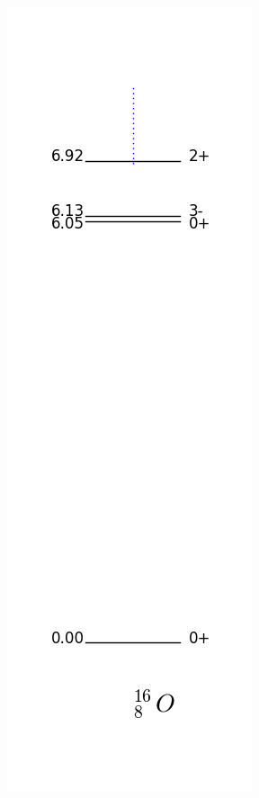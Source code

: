 \documentclass[12pt]{article}
\begin{document}
\begin{figure}
\begin{center}
\includegraphics[scale=0.4]{images/levels_16O.png}

\end{center}
\end{figure}
\end{document}
